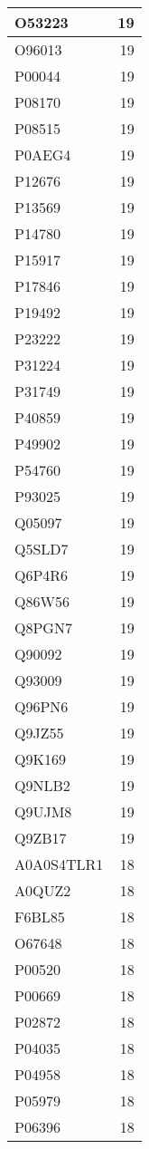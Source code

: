 \documentclass[
]{book}
\theoremstyle{definition}
\theoremstyle{definition}
\theoremstyle{definition}
\theoremstyle{definition}
\theoremstyle{remark}
\begin{document}
\begin{table}
\begin{tabular}{l|r}
\hline
O53223 & 19\\
\hline
O96013 & 19\\
\hline
P00044 & 19\\
\hline
P08170 & 19\\
\hline
P08515 & 19\\
\hline
P0AEG4 & 19\\
\hline
P12676 & 19\\
\hline
P13569 & 19\\
\hline
P14780 & 19\\
\hline
P15917 & 19\\
\hline
P17846 & 19\\
\hline
P19492 & 19\\
\hline
P23222 & 19\\
\hline
P31224 & 19\\
\hline
P31749 & 19\\
\hline
P40859 & 19\\
\hline
P49902 & 19\\
\hline
P54760 & 19\\
\hline
P93025 & 19\\
\hline
Q05097 & 19\\
\hline
Q5SLD7 & 19\\
\hline
Q6P4R6 & 19\\
\hline
Q86W56 & 19\\
\hline
Q8PGN7 & 19\\
\hline
Q90092 & 19\\
\hline
Q93009 & 19\\
\hline
Q96PN6 & 19\\
\hline
Q9JZ55 & 19\\
\hline
Q9K169 & 19\\
\hline
Q9NLB2 & 19\\
\hline
Q9UJM8 & 19\\
\hline
Q9ZB17 & 19\\
\hline
A0A0S4TLR1 & 18\\
\hline
A0QUZ2 & 18\\
\hline
F6BL85 & 18\\
\hline
O67648 & 18\\
\hline
P00520 & 18\\
\hline
P00669 & 18\\
\hline
P02872 & 18\\
\hline
P04035 & 18\\
\hline
P04958 & 18\\
\hline
P05979 & 18\\
\hline
P06396 & 18\\

\end{tabular}
\end{table}
\end{document}
